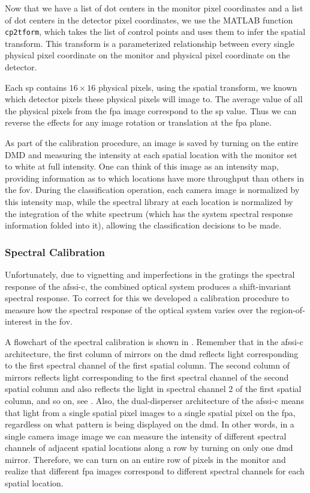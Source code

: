 Now that we have a list of dot centers in the monitor pixel coordinates and a list of dot centers in the detector pixel coordinates, we use the MATLAB function \texttt{cp2tform}, which takes the list of control points and uses them to infer the spatial transform. This transform is a parameterized relationship between every single physical pixel coordinate on the monitor and physical pixel coordinate on the detector. 

Each \gls{sp} contains $16 \times 16$ physical pixels, using the spatial transform, we known which detector pixels these physical pixels will image to. The average value of all the physical pixels from the \gls{fpa} image correspond to the \gls{sp} value. Thus we can reverse the effects for any image rotation or translation at the \gls{fpa} plane.

As part of the calibration procedure, an image is saved by turning on the entire DMD and measuring the intensity at each spatial location with the monitor set to white at full intensity. One can think of this image as an intensity map, providing information as to which locations have more throughput than others in the \gls{fov}. During the classification operation, each camera image is normalized by this intensity map, while the spectral library at each location is normalized by the integration of the white spectrum (which has the system spectral response information folded into it), allowing the classification decisions to be made. 


\subsubsection{Spectral Calibration}

Unfortunately, due to vignetting and imperfections in the gratings the spectral response of the \gls{afssi-c}, the combined optical system produces a shift-invariant spectral response. To correct for this we developed a calibration procedure to measure how the spectral response of the optical system varies over the region-of-interest in the \gls{fov}. 

A flowchart of the spectral calibration is shown in . Remember that in the \gls{afssi-c} architecture, the first column of mirrors on the \gls{dmd} reflects light corresponding to the first spectral channel of the first spatial column. The second column of mirrors reflects light corresponding to the first spectral channel of the second spatial column and also reflects the light in spectral channel 2 of the first spatial column, and so on, see . Also, the dual-disperser architecture of the \gls{afssi-c} means that light from a single spatial pixel images to a single spatial pixel on the \gls{fpa}, regardless on what pattern is being displayed on the \gls{dmd}. In other words, in a single camera image image we can measure the intensity of different spectral channels of adjacent spatial locations along a row by turning on only one \gls{dmd} mirror. Therefore, we can turn on an entire row of pixels in the monitor and realize that different \gls{fpa} images correspond to different spectral channels for each spatial location. 

